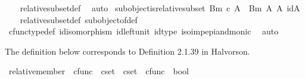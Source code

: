 \begin{isabellebody}
%
\isadelimproof
\ \ %
\endisadelimproof
%
\isatagproof
{}\isamarkupfalse%
\ relative{\isacharunderscore}{\kern0pt}subset{\isacharunderscore}{\kern0pt}def\ \isamarkupfalse%
\ auto%
\endisatagproof
{\isafoldproof}%
%
\isadelimproof
\isanewline
%
\endisadelimproof
\isanewline
{}\isamarkupfalse%
\ subobject{\isacharunderscore}{\kern0pt}is{\isacharunderscore}{\kern0pt}relative{\isacharunderscore}{\kern0pt}subset{\isacharcolon}{\kern0pt}\ {\isachardoublequoteopen}{\isacharparenleft}{\kern0pt}B{\isacharcomma}{\kern0pt}m{\isacharparenright}{\kern0pt}\ {\isasymsubseteq}\isactrlsub c\ A\ {\isasymlongleftrightarrow}\ {\isacharparenleft}{\kern0pt}B{\isacharcomma}{\kern0pt}m{\isacharparenright}{\kern0pt}\ {\isasymsubseteq}\isactrlbsub A\isactrlesub \ {\isacharparenleft}{\kern0pt}A{\isacharcomma}{\kern0pt}\ id{\isacharparenleft}{\kern0pt}A{\isacharparenright}{\kern0pt}{\isacharparenright}{\kern0pt}{\isachardoublequoteclose}\isanewline
%
\isadelimproof
\ \ %
\endisadelimproof
%
\isatagproof
{}\isamarkupfalse%
\ relative{\isacharunderscore}{\kern0pt}subset{\isacharunderscore}{\kern0pt}def{}\ subobject{\isacharunderscore}{\kern0pt}of{\isacharunderscore}{\kern0pt}def{}\isanewline
\ \ \isamarkupfalse%
\ cfunc{\isacharunderscore}{\kern0pt}type{\isacharunderscore}{\kern0pt}def\ id{\isacharunderscore}{\kern0pt}isomorphism\ id{\isacharunderscore}{\kern0pt}left{\isacharunderscore}{\kern0pt}unit\ id{\isacharunderscore}{\kern0pt}type\ iso{\isacharunderscore}{\kern0pt}imp{\isacharunderscore}{\kern0pt}epi{\isacharunderscore}{\kern0pt}and{\isacharunderscore}{\kern0pt}monic\ \isamarkupfalse%
\ auto%
\endisatagproof
{\isafoldproof}%
%
\isadelimproof
%
\endisadelimproof
%
\begin{isamarkuptext}%
The definition below corresponds to Definition 2.1.39 in Halvorson.%
\end{isamarkuptext}\isamarkuptrue%
\isamarkupfalse%
\ relative{\isacharunderscore}{\kern0pt}member\ {\isacharcolon}{\kern0pt}{\isacharcolon}{\kern0pt}\ {\isachardoublequoteopen}cfunc\ {\isasymRightarrow}\ cset\ {\isasymRightarrow}\ cset\ {\isasymtimes}\ cfunc\ {\isasymRightarrow}\ bool{\isachardoublequoteclose}\ {\isacharparenleft}{\kern0pt}{\isachardoublequoteopen}{\isacharunderscore}{\kern0pt}\ {\isasymin}\isactrlbsub {\isacharunderscore}{\kern0pt}\isactrlesub \ {\isacharunderscore}{\kern0pt}{\isachardoublequoteclose}\ {\isacharbrackleft}{\kern0pt}{}{}{\isacharcomma}{\kern0pt}{}{}{\isacharcomma}{\kern0pt}{}{}{\isacharbrackright}{\kern0pt}{}{}{\isacharparenright}{\kern0pt}\ \isanewline

\end{isabellebody}
